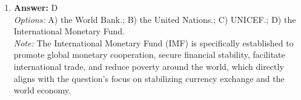 \documentclass[12pt]{article}
\begin{document}
\begin{enumerate}[label=\arabic*.]
\\ \textit{Note:} Exceptionalism links isolationist and internationalist strategies by suggesting that both approaches, despite their different methodologies, ultimately aim to promote and protect liberal values, such as democracy and human rights, on a global scale.
\item \textbf{Answer:} D
\\ \textit{Options:} A) the World Bank.; B) the United Nations.; C) UNICEF.; D) the International Monetary Fund.
\\ \textit{Note:} The International Monetary Fund (IMF) is specifically established to promote global monetary cooperation, secure financial stability, facilitate international trade, and reduce poverty around the world, which directly aligns with the question's focus on stabilizing currency exchange and the world economy.
\end{enumerate}
\end{document}
